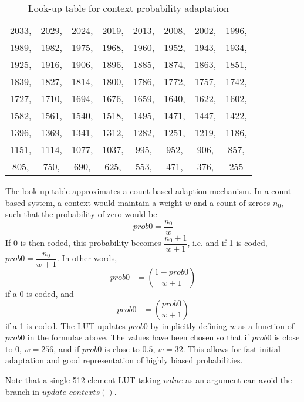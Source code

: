 \begin{table}[!ht]
\begin{tabular}{|cccccccc|}
          2033,& 2029,& 2024,& 2019,& 2013,& 2008,& 2002,& 1996,\\
          1989,& 1982,& 1975,& 1968,& 1960,& 1952,& 1943,& 1934,\\
          1925,& 1916,& 1906,& 1896,& 1885,& 1874,& 1863,& 1851,\\
          1839,& 1827,& 1814,& 1800,& 1786,& 1772,& 1757,& 1742,\\
          1727,& 1710,& 1694,& 1676,& 1659,& 1640,& 1622,& 1602,\\
          1582,& 1561,& 1540,& 1518,& 1495,& 1471,& 1447,& 1422,\\
          1396,& 1369,& 1341,& 1312,& 1282,& 1251,& 1219,& 1186,\\
          1151,& 1114,& 1077,& 1037,&  995,&  952,&  906,&  857,\\
           805,&  750,&  690,&  625,&  553,&  471,&  376,&  255\\
\hline
\end{tabular}
\caption{Look-up table for context probability adaptation}
\label{table:lut}
\end{table}

\begin{informative}
The look-up table approximates a count-based adaption mechanism. In
a count-based system, a context would maintain a weight $w$ and a
count of zeroes $n_0$, such that the probability of zero would
be
\[prob0=\dfrac{n_0}{w}\]
If 0 is then coded, this probability becomes $\dfrac{n_0+1}{w+1}$,
i.e. and if 1 is coded, $prob0=\dfrac{n_0}{w+1}$. In other words,
\[prob0+=\left(\dfrac{1-prob0}{w+1}\right)\]
if a 0 is coded, and 
\[prob0-=\left(\dfrac{prob0}{w+1}\right)\]
if a 1 is coded.
The LUT updates $prob0$ by implicitly defining $w$ as a function of
$prob0$ in the formulae above. The values have been chosen so that if $prob0$ is close
to 0, $w=256$, and if $prob0$ is close to $0.5$, $w=32$. This allows
for fast initial adaptation and good representation of highly biased
probabilities. 

Note that a single 512-element LUT taking $value$ as an argument can
avoid the branch in $update\_contexts()$.
\end{informative}

